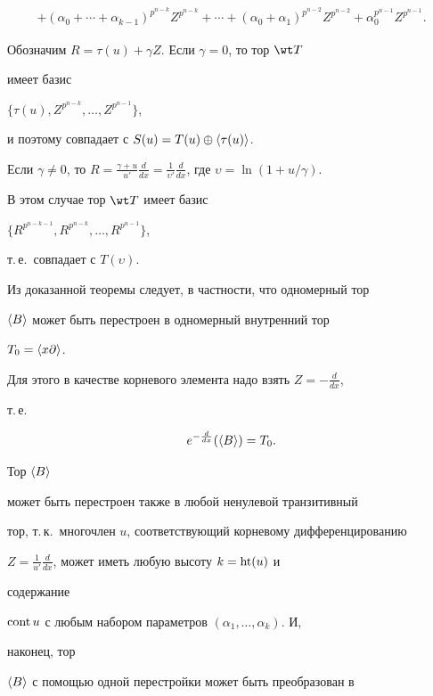 \begin{pf}
\begin{multline*}
+ (\alpha_0+\dotsb+\alpha_{k-1})^{p^{n-k}}Z^{p^{n-k}}+\dotsb+ 


(\alpha_0+\alpha_1)^{p^{n-2}}Z^{p^{n-2}}+


\alpha_0^{p^{n-1}}Z^{p^{n-1}}. 


\end{multline*}  


Обозначим $R=\tau(u)+\gamma Z$. Если $\gamma=0$, то тор $\wt T$ 


имеет базис 


$\{\tau(u),Z^{p^{n-k}},\dotsc,Z^{p^{n-1}}\}$, 


и поэтому совпадает с $S(u)=T(u)\oplus\langle\tau(u)\rangle$. 


Если $\gamma\ne 0$, то $R=\frac{\gamma+u}{u'}\frac{d}{dx}= 


\frac{1}{\upsilon'}\frac{d}{dx}$, где $\upsilon=\ln(1+u/\gamma)$. 


В этом случае тор $\wt T$ имеет базис 


$\{R^{p^{n-k-1}},R^{p^{n-k}},\dotsc,R^{p^{n-1}}\}$, 


т.\,е.~совпадает с $T(\upsilon)$. 


\end{pf} 


 


Из доказанной теоремы следует, в частности, что одномерный тор 


$\langle B\rangle$ может быть перестроен в одномерный внутренний тор 


$T_0=\langle x\partial\rangle$. 


Для этого в качестве корневого элемента надо взять $Z=-\frac{d}{dx}$, 


т.\,е. 


$$ 


e^{-\frac{d}{dx}}(\la B\ra)=T_0. 


$$ 


Тор $\langle B\rangle$ 


может быть перестроен также в любой ненулевой транзитивный 


тор, т.\,к.~многочлен $u$, соответствующий корневому дифференцированию 


$Z=\frac{1}{u'}\frac{d}{dx}$, может иметь любую высоту $k=\operatorname{ht}(u)$ и 


содержание 


$\operatorname{cont} u$ с любым набором параметров $(\alpha_1,\dotsc,\alpha_k)$. И, 


наконец, тор 


$\langle B\rangle$ с помощью одной перестройки может быть преобразован в 


